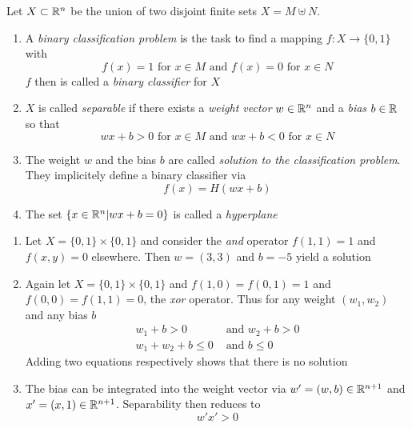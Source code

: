 \begin{definition}
	Let \( X \subset \mathbb{R}^n \) be the union of two disjoint finite sets \( X = M \uplus N \).
    \begin{enumerate}
		\item A \emph{binary classification problem} is the task to find a mapping \( f: X \to \{ 0, 1 \} \) with
			\[
				f(x) = 1 \text{ for } x \in M \text{ and } f(x) = 0 \text{ for } x \in N
			\]
			\( f \) then is called a \emph{binary classifier} for \( X \)
		\item \( X \) is called \emph{separable} if there exists a \emph{weight vector} \( w \in \mathbb{R}^n \) 
			and a \emph{bias} \( b \in \mathbb{R} \) so that
				\[
						wx + b > 0 \text{ for } x \in M  \text{ and } 
						wx + b < 0 \text{ for } x \in N
				\]
		\item The weight \( w \) and the bias \( b \) are called \emph{solution to the classification problem}. 
		    They implicitely define a binary classifier via
				\[
					f(x) = H(wx + b)
				\]
		\item The set \( \{ x \in \mathbb{R}^n | wx + b = 0 \} \) is called a \emph{hyperplane}
    \end{enumerate}
\end{definition}
\bigskip


\begin{examples}\hfill
    \begin{enumerate}
        \item Let \( X = \{ 0, 1 \} \times \{ 0, 1 \} \) and consider the \emph{and} operator 
		    \( f(1, 1) = 1 \) and \( f(x, y) = 0 \) elsewhere. Then \( w = (3, 3) \) and \( b = -5 \) 
			yield a solution
        \item Again let \( X = \{ 0, 1 \} \times \{ 0, 1 \} \) and \( f(1, 0) = f(0, 1) = 1 \) and 
			\( f(0, 0) = f(1, 1) = 0 \), the \emph{xor} operator. Thus for any weight \( (w_1, w_2) \) and 
			any bias \( b \)
				\[
					\begin{split}
						w_1 + b > 0 & \text{ and } w_2 + b > 0 \\
						w_1 + w_2 + b \le 0 & \text{ and } b \le 0
					\end{split}
				\]
			Adding two equations respectively shows that there is no solution
		\item The bias can be integrated into the weight vector via \( w' = (w, b) \in \mathbb{R}^{n + 1} \) and 
			\( x' = (x, 1) \in \mathbb{R}^{n + 1} \). Separability then reduces to
				\[
					w'x' > 0
				\]
	\end{enumerate}
\end{examples}
\bigskip


